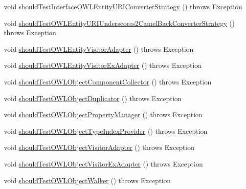 \begin{DoxyCompactItemize}
\item 
void \hyperlink{classorg_1_1semanticweb_1_1owlapi_1_1contract_1_1_contract_owlapi_util_test_a474cb0b4bb6f92c377f6d5ebaccf484e}{should\-Test\-Interface\-O\-W\-L\-Entity\-U\-R\-I\-Converter\-Strategy} ()  throws Exception 
\item 
void \hyperlink{classorg_1_1semanticweb_1_1owlapi_1_1contract_1_1_contract_owlapi_util_test_abb8b3ef9efd97c23cbd3b13dabbf9ef3}{should\-Test\-O\-W\-L\-Entity\-U\-R\-I\-Underscores2\-Camel\-Back\-Converter\-Strategy} ()  throws Exception 
\item 
void \hyperlink{classorg_1_1semanticweb_1_1owlapi_1_1contract_1_1_contract_owlapi_util_test_a01b86feec9ff324459de38cef24adc07}{should\-Test\-O\-W\-L\-Entity\-Visitor\-Adapter} ()  throws Exception 
\item 
void \hyperlink{classorg_1_1semanticweb_1_1owlapi_1_1contract_1_1_contract_owlapi_util_test_abaccc48d9935cc9b8938a6be90ff09b6}{should\-Test\-O\-W\-L\-Entity\-Visitor\-Ex\-Adapter} ()  throws Exception 
\item 
void \hyperlink{classorg_1_1semanticweb_1_1owlapi_1_1contract_1_1_contract_owlapi_util_test_a002305a4276698351ab8bc0435a5e34c}{should\-Test\-O\-W\-L\-Object\-Component\-Collector} ()  throws Exception 
\item 
void \hyperlink{classorg_1_1semanticweb_1_1owlapi_1_1contract_1_1_contract_owlapi_util_test_a0f10c85a39c759aa5c855b8ea064933c}{should\-Test\-O\-W\-L\-Object\-Duplicator} ()  throws Exception 
\item 
void \hyperlink{classorg_1_1semanticweb_1_1owlapi_1_1contract_1_1_contract_owlapi_util_test_a176f9a3e7467973ef9f773099e6b08c5}{should\-Test\-O\-W\-L\-Object\-Property\-Manager} ()  throws Exception 
\item 
void \hyperlink{classorg_1_1semanticweb_1_1owlapi_1_1contract_1_1_contract_owlapi_util_test_aab115ada48675ab141efde2af1e043e1}{should\-Test\-O\-W\-L\-Object\-Type\-Index\-Provider} ()  throws Exception 
\item 
void \hyperlink{classorg_1_1semanticweb_1_1owlapi_1_1contract_1_1_contract_owlapi_util_test_ac4f99f9dbe23f61bb48a5e4a372b09f0}{should\-Test\-O\-W\-L\-Object\-Visitor\-Adapter} ()  throws Exception 
\item 
void \hyperlink{classorg_1_1semanticweb_1_1owlapi_1_1contract_1_1_contract_owlapi_util_test_a726a8385e6c7202c800426783b5edde5}{should\-Test\-O\-W\-L\-Object\-Visitor\-Ex\-Adapter} ()  throws Exception 
\item 
void \hyperlink{classorg_1_1semanticweb_1_1owlapi_1_1contract_1_1_contract_owlapi_util_test_a9091d4e354e53197a3c7fb7c272aa486}{should\-Test\-O\-W\-L\-Object\-Walker} ()  throws Exception 

\end{DoxyCompactItemize}

